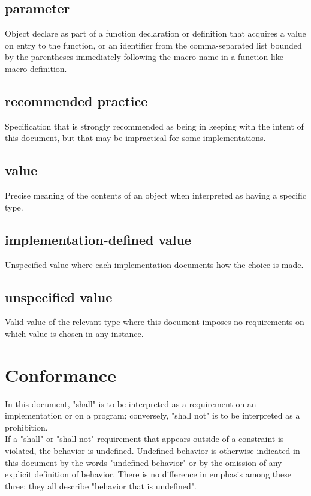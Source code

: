 \documentclass{article}
\begin{document}
\subsection*{parameter}
Object declare as part of a function declaration or definition that acquires a value on
entry to the function, or an identifier from the comma-separated list bounded by the
parentheses immediately following the macro name in a function-like macro definition.

\subsection*{recommended practice}
Specification that is strongly recommended as being in keeping with the intent of this
document, but that may be impractical for some implementations.

\subsection*{value}
Precise meaning of the contents of an object when interpreted as having a specific type.

\subsection*{implementation-defined value}
Unspecified value where each implementation documents how the choice is made.

\subsection*{unspecified value}
Valid value of the relevant type where this document imposes no requirements on which
value is chosen in any instance.

\section{Conformance}
In this document, "shall" is to be interpreted as a requirement on an implementation
or on a program; conversely, "shall not" is to be interpreted as a prohibition. \\
If a "shall" or "shall not" requirement that appears outside of a constraint is violated,
the behavior is undefined.  Undefined behavior is otherwise indicated in this document by
the words "undefined behavior" or by the omission of any explicit definition of behavior.
There is no difference in emphasis among these three; they all describe "behavior that is
undefined".
\end{document}
